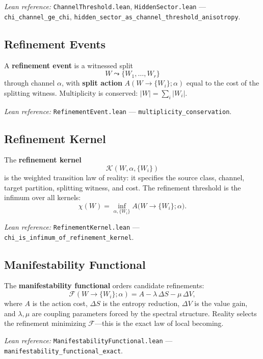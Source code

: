 \emph{Lean reference:} \texttt{ChannelThreshold.lean}, \texttt{HiddenSector.lean} --- \texttt{chi\_channel\_ge\_chi}, \texttt{hidden\_sector\_as\_channel\_threshold\_anisotropy}.

\subsection{Refinement Events}
\label{sec:manifestability:events}

A \textbf{refinement event} is a witnessed split
\[
W \leadsto \{W_1, \dots, W_r\}
\]
through channel $\alpha$, with \textbf{split action} $A(W \to \{W_i\}; \alpha)$ equal to the cost of the splitting witness.  Multiplicity is conserved: $|W| = \sum_i |W_i|$.

\emph{Lean reference:} \texttt{RefinementEvent.lean} --- \texttt{multiplicity\_conservation}.

\subsection{Refinement Kernel}
\label{sec:manifestability:kernel}

The \textbf{refinement kernel}
\[
\mathcal{K}(W, \alpha, \{W_i\})
\]
is the weighted transition law of reality: it specifies the source class, channel, target partition, splitting witness, and cost.  The refinement threshold is the infimum over all kernels:
\[
\chi(W) = \inf_{\alpha, \{W_i\}} A\bigl(W \to \{W_i\}; \alpha\bigr).
\]

\emph{Lean reference:} \texttt{RefinementKernel.lean} --- \texttt{chi\_is\_infimum\_of\_refinement\_kernel}.

\subsection{Manifestability Functional}
\label{sec:manifestability:functional}

The \textbf{manifestability functional} orders candidate refinements:
\[
\mathcal{F}(W \to \{W_i\}; \alpha) = A - \lambda\,\Delta S - \mu\,\Delta V,
\]
where $A$ is the action cost, $\Delta S$ is the entropy reduction, $\Delta V$ is the value gain, and $\lambda, \mu$ are coupling parameters forced by the spectral structure.  Reality selects the refinement minimizing $\mathcal{F}$---this is the exact law of local becoming.

\emph{Lean reference:} \texttt{ManifestabilityFunctional.lean} --- \texttt{manifestability\_functional\_exact}.

